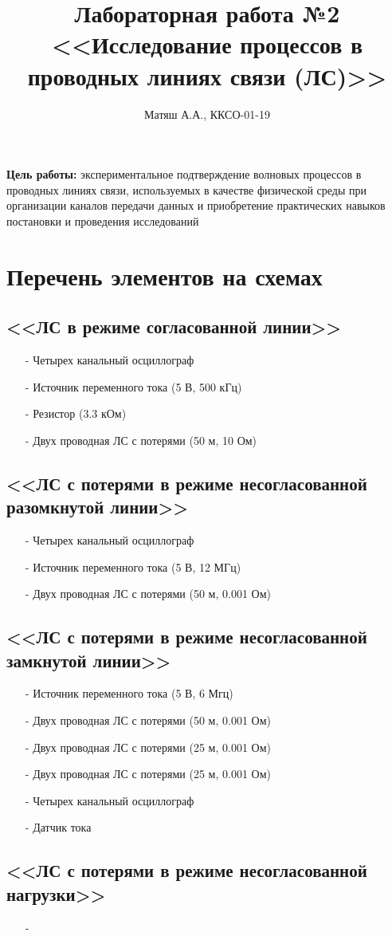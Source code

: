 \documentclass[11pt]{article}
\title{\textbf{Лабораторная работа №2\\<<Исследование процессов в проводных линиях связи (ЛС)>>}}
\author{Матяш А.А., ККСО-01-19}
\date{}
\begin{document}
\maketitle
\thispagestyle{empty}
\textbf{Цель работы:} экспериментальное подтверждение волновых процессов в проводных линиях связи, используемых в качестве физической среды при организации каналов передачи данных и приобретение практических навыков постановки и проведения исследований 
\section{Перечень элементов на схемах}
\subsection{<<ЛС в режиме согласованной линии>>}
\begin{itemize}
    \item[-] Четырех канальный осциллограф
    \item[-] Источник переменного тока (5 В, 500 кГц)
    \item[-] Резистор (3.3 кОм)
    \item[-] Двух проводная ЛС с потерями (50 м, 10 Ом)
\end{itemize}
\subsection{<<ЛС с потерями в режиме несогласованной разомкнутой линии>>}
\begin{itemize}
    \item[-] Четырех канальный осциллограф
    \item[-] Источник переменного тока (5 В, 12 МГц)
    \item[-] Двух проводная ЛС с потерями (50 м, 0.001 Ом)
\end{itemize}
\subsection{<<ЛС с потерями в режиме несогласованной замкнутой линии>>}
\begin{itemize}
    \item[-] Источник переменного тока (5 В, 6 Мгц)
    \item[-] Двух проводная ЛС с потерями (50 м, 0.001 Ом)
    \item[-] Двух проводная ЛС с потерями (25 м, 0.001 Ом)
    \item[-] Двух проводная ЛС с потерями (25 м, 0.001 Ом)
    \item[-] Четырех канальный осциллограф
    \item[-] Датчик тока
\end{itemize}
\subsection{<<ЛС с потерями в режиме несогласованной нагрузки>>}
\begin{itemize}
    \item[-] 
\end{itemize}
\end{document}
